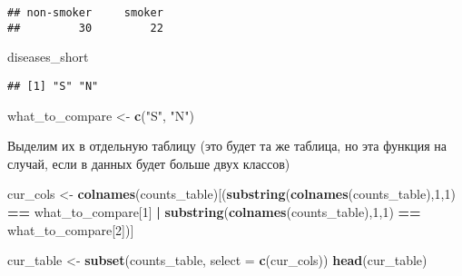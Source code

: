 \documentclass[
]{article}
\newenvironment{Shaded}{\begin{snugshade}}{\end{snugshade}}
\newcommand{\DataTypeTok}[1]{\textcolor[rgb]{0.13,0.29,0.53}{#1}}
\newcommand{\DecValTok}[1]{\textcolor[rgb]{0.00,0.00,0.81}{#1}}
\newcommand{\KeywordTok}[1]{\textcolor[rgb]{0.13,0.29,0.53}{\textbf{#1}}}
\newcommand{\NormalTok}[1]{#1}
\newcommand{\OperatorTok}[1]{\textcolor[rgb]{0.81,0.36,0.00}{\textbf{#1}}}
\newcommand{\StringTok}[1]{\textcolor[rgb]{0.31,0.60,0.02}{#1}}
\begin{document}
\begin{verbatim}
## non-smoker     smoker 
##         30         22
\end{verbatim}

\begin{Shaded}
\begin{Highlighting}[]
\NormalTok{diseases_short}
\end{Highlighting}
\end{Shaded}

\begin{verbatim}
## [1] "S" "N"
\end{verbatim}

\begin{Shaded}
\begin{Highlighting}[]
\NormalTok{what_to_compare <-}\StringTok{ }\KeywordTok{c}\NormalTok{(}\StringTok{"S"}\NormalTok{, }\StringTok{"N"}\NormalTok{)}
\end{Highlighting}
\end{Shaded}

Выделим их в отдельную таблицу (это будет та же таблица, но эта функция
на случай, если в данных будет больше двух классов)

\begin{Shaded}
\begin{Highlighting}[]
\NormalTok{cur_cols <-}\StringTok{ }\KeywordTok{colnames}\NormalTok{(counts_table)[(}\KeywordTok{substring}\NormalTok{(}\KeywordTok{colnames}\NormalTok{(counts_table),}\DecValTok{1}\NormalTok{,}\DecValTok{1}\NormalTok{) }\OperatorTok{==}\StringTok{ }\NormalTok{what_to_compare[}\DecValTok{1}\NormalTok{] }
                                    \OperatorTok{|}\StringTok{ }\KeywordTok{substring}\NormalTok{(}\KeywordTok{colnames}\NormalTok{(counts_table),}\DecValTok{1}\NormalTok{,}\DecValTok{1}\NormalTok{) }\OperatorTok{==}\StringTok{ }\NormalTok{what_to_compare[}\DecValTok{2}\NormalTok{])]}

\NormalTok{cur_table <-}\StringTok{ }\KeywordTok{subset}\NormalTok{(counts_table, }\DataTypeTok{select =} \KeywordTok{c}\NormalTok{(cur_cols))}
\KeywordTok{head}\NormalTok{(cur_table)}
\end{Highlighting}
\end{Shaded}
\end{document}
